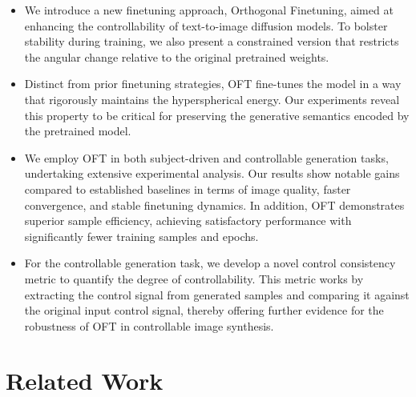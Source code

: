 \begin{itemize}[leftmargin=*,nosep]

    \item We introduce a new finetuning approach, Orthogonal Finetuning, aimed at enhancing the controllability of text-to-image diffusion models. To bolster stability during training, we also present a constrained version that restricts the angular change relative to the original pretrained weights.
    \item Distinct from prior finetuning strategies, OFT fine-tunes the model in a way that rigorously maintains the hyperspherical energy. Our experiments reveal this property to be critical for preserving the generative semantics encoded by the pretrained model.
    \item We employ OFT in both subject-driven and controllable generation tasks, undertaking extensive experimental analysis. Our results show notable gains compared to established baselines in terms of image quality, faster convergence, and stable finetuning dynamics. In addition, OFT demonstrates superior sample efficiency, achieving satisfactory performance with significantly fewer training samples and epochs.
    \item For the controllable generation task, we develop a novel control consistency metric to quantify the degree of controllability. This metric works by extracting the control signal from generated samples and comparing it against the original input control signal, thereby offering further evidence for the robustness of OFT in controllable image synthesis.
\end{itemize}

\section{Related Work}

